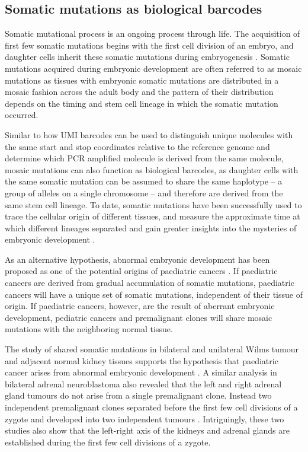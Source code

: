 \subsection{Somatic mutations as biological barcodes}

Somatic mutational process is an ongoing process through life. The acquisition of first few somatic mutations begins with the first cell division of an embryo, and daughter cells inherit these somatic mutations during embryogenesis \cite{}. Somatic mutations acquired during embryonic development are often referred to as mosaic mutations as tissues with embryonic somatic mutations are distributed in a mosaic fashion across the adult body and the pattern of their distribution depends on the timing and stem cell lineage in which the somatic mutation occurred. 

Similar to how UMI barcodes can be used to distinguish unique molecules with the same start and stop coordinates relative to the reference genome and determine which PCR amplified molecule is derived from the same molecule, mosaic mutations can also function as biological barcodes, as daughter cells with the same somatic mutation can be assumed to share the same haplotype – a group of alleles on a single chromosome – and therefore are derived from the same stem cell lineage. To date, somatic mutations have been successfully used to trace the cellular origin of different tissues, and measure the approximate time at which different lineages separated and gain greater insights into the mysteries of embryonic development \cite{Behjati2014-gb}.

As an alternative hypothesis, abnormal embryonic development has been proposed as one of the potential origins of paediatric cancers \cite{Marshall2014-ec}. If paediatric cancers are derived from gradual accumulation of somatic mutations, paediatric cancers will have a unique set of somatic mutations, independent of their tissue of origin. If paediatric cancers, however, are the result of aberrant embryonic development, pediatric cancers and premalignant clones will share mosaic mutations with the neighboring normal tissue. 

The study of shared somatic mutations in bilateral and unilateral Wilms tumour and adjacent normal kidney tissues supports the hypothesis that paediatric cancer arises from abnormal embryonic development \cite{Coorens2019-zf}. A similar analysis in bilateral adrenal neuroblastoma also revealed that the left and right adrenal gland tumours do not arise from a single premalignant clone. Instead two independent premalignant clones separated before the first few cell divisions of a zygote and developed into two independent tumours \cite{Coorens2020-ut}. Intriguingly, these two studies also show that the left-right axis of the kidneys and adrenal glands are established during the first few cell divisions of a zygote.

